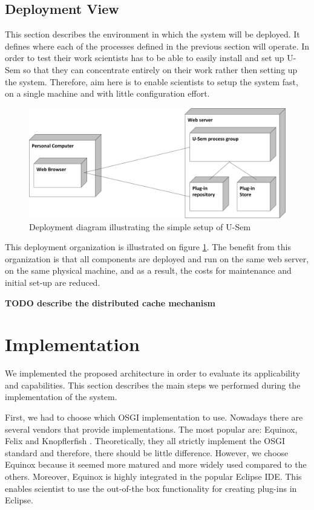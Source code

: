 \subsection{Deployment View}

This section describes the environment in which the system will be deployed. It defines where each of the processes defined in the previous section will operate. In order to test their work scientists has to be able to easily install and set up U-Sem so that they can concentrate entirely on their work rather then setting up the system. Therefore, aim here is to enable scientists to setup the system fast, on a single machine and with little configuration effort. 

\begin{figure}[h!]
  \centering
  	\includegraphics[scale=0.70]{plug-in/layers/simple_setup.png}
  \caption{Deployment diagram illustrating the simple setup of U-Sem}
  \label{fig:simple_set}
\end{figure}

This deployment organization is illustrated on figure \ref{fig:simple_set}. The benefit from this organization is that all components are deployed and run on the same web server, on the same physical machine, and as a result, the costs for maintenance and initial set-up are reduced.

\textbf{TODO describe the distributed cache mechanism}

\section{Implementation}
\label{sec:implPlugin}

We implemented the proposed architecture in order to evaluate its applicability and capabilities. This section describes the main steps we performed during the implementation of the system.

First, we had to choose which OSGI implementation to use. Nowadays there are several vendors that provide implementations. The most popular are: Equinox, Felix and Knopflerfish \cite{OSGI}. Theoretically, they all strictly implement the OSGI standard and therefore, there should be little difference. However, we choose Equinox because it seemed more matured and more widely used compared to the others. Moreover, Equinox is highly integrated in the popular Eclipse IDE. This enables scientist to use the out-of-the box functionality for creating plug-ins in Eclipse.

